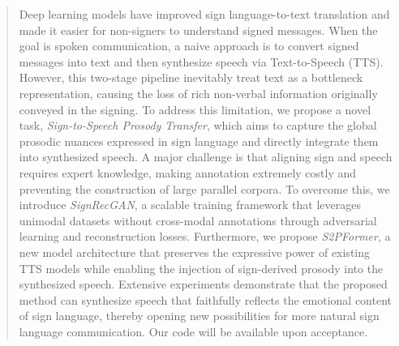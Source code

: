 

\begin{abstract}
Deep learning models have improved sign language-to-text translation and made it easier for non-signers to understand signed messages. 
When the goal is spoken communication, a naive approach is to convert signed messages into text and then synthesize speech via Text-to-Speech (TTS).
However, this two-stage pipeline inevitably treat text as a bottleneck representation, causing the loss of rich non-verbal information originally conveyed in the signing. 
To address this limitation, we propose a novel task, 
\emph{Sign-to-Speech Prosody Transfer}, 
which aims to capture the global prosodic nuances expressed
in sign language and directly integrate them into synthesized speech. 
A major challenge is that aligning sign and speech requires expert knowledge, 
making annotation extremely costly and preventing the construction of large parallel corpora. 
To overcome this, we introduce \emph{SignRecGAN}, 
a scalable training framework that leverages unimodal datasets 
without cross-modal annotations through adversarial learning 
and reconstruction losses. 
Furthermore, we propose \emph{S2PFormer}, 
a new model architecture that preserves the expressive power of existing TTS models 
while enabling the injection of sign-derived prosody into the synthesized speech.
Extensive experiments demonstrate that the proposed method can synthesize speech that faithfully reflects the emotional content of sign language, thereby opening new possibilities for more natural sign language communication. Our code will be available upon acceptance.

\end{abstract}
